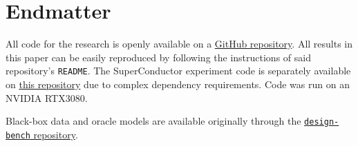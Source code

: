 \chapter{Endmatter} \label{sec:endmatter}

All code for the research is openly available on a
\href{https://github.com/bd3dowling/diffusion-research}{GitHub repository}.
All results in this paper can be easily reproduced by following the instructions of said
repository's \texttt{README}. The SuperConductor experiment code is separately available on
\href{https://github.com/bd3dowling/superconductor}{this repository} due to complex dependency
requirements. Code was run on an NVIDIA RTX3080.

Black-box data and oracle models are available originally through the
\href{https://github.com/brandontrabucco/design-bench}{\texttt{design-bench} repository}.
